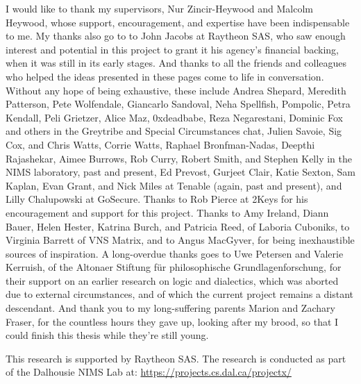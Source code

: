 \printnoidxglossaries
\clearpage
{}

\begin{acknowledgements}
I would like to thank my supervisors, Nur
Zincir-Heywood and Malcolm Heywood, whose support, encouragement, and expertise
have been indispensable to me. My thanks also go to to John Jacobs at Raytheon
SAS, who saw enough interest and potential in this project to grant it his
agency's financial backing, when it was still in its early stages. And thanks to
all the friends and colleagues who helped the ideas presented in these pages
come to life in conversation. Without any hope of being exhaustive, these
include Andrea Shepard, Meredith Patterson, Pete Wolfendale, Giancarlo Sandoval,
Neha Spellfish, Pompolic, Petra Kendall, Peli Grietzer, Alice Maz, 0xdeadbabe,
Reza Negarestani, Dominic Fox and others in the Greytribe and Special
Circumstances chat, Julien Savoie, Sig Cox, and Chris Watts, Corrie Watts,
Raphael Bronfman-Nadas, Deepthi Rajashekar, Aimee Burrows, Rob Curry, Robert
Smith, and Stephen Kelly in the NIMS laboratory, past and present, Ed Prevost,
Gurjeet Clair, Katie Sexton, Sam Kaplan, Evan Grant, and Nick Miles at Tenable
(again, past and present), and Lilly Chalupowski at GoSecure. Thanks to Rob
Pierce at 2Keys for his encouragement and support for this project. Thanks to Amy
Ireland, Diann Bauer, Helen Hester, Katrina Burch, and Patricia Reed, of Laboria
Cuboniks, to Virginia Barrett of VNS Matrix, and to Angus MacGyver, for being
inexhaustible sources of inspiration. A long-overdue thanks goes to Uwe Petersen
and Valerie Kerruish, of the Altonaer Stiftung für philosophische
Grundlagenforschung, for their support on an earlier research on logic and
dialectics, which was aborted due to external circumstances, and of which the
current project remains a distant descendant. And thank you to my long-suffering
parents Marion and Zachary Fraser, for the countless hours they gave up, looking
after my brood, so that I could finish this thesis while they're still young.

This research is supported by Raytheon SAS. The research is conducted
as part of the Dalhousie NIMS Lab at: \url{https://projects.cs.dal.ca/projectx/}
\end{acknowledgements}

\clearpage
\mainmatter